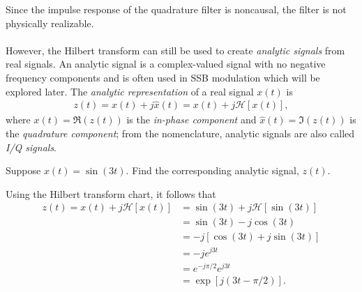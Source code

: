 \documentclass{report}
\begin{document}
Since the impulse response of the quadrature filter is noncausal, the filter is not physically realizable.
\\ \\
However, the Hilbert transform can still be used to create \emph{analytic signals} from real signals. An analytic signal 
is a complex-valued signal with no negative frequency components and is often used in SSB modulation which will be explored later. 
The \emph{analytic representation} of a real signal $x(t)$ is 
\begin{align}
    z(t) = x(t) + j\hat{x}(t) = x(t) + j\mathcal{H}[x(t)],
\end{align}
where $x(t)=\Re(z(t))$ is the \emph{in-phase component} and $\hat{x}(t)=\Im(z(t))$ is the \emph{quadrature component}; from the nomenclature, 
analytic signals are also called \emph{I/Q signals}.

\begin{example}
    Suppose $x(t)=\sin(3t)$. Find the corresponding analytic signal, $z(t)$.
\end{example}
\begin{solution}
    Using the Hilbert transform chart, it follows that  
    \begin{align*}
        z(t) = x(t) + j\mathcal{H}[x(t)] &= \sin(3t) + j\mathcal{H}[\sin(3t)] \\
        &= \sin(3t) - j\cos(3t) \\
        &= -j[\cos(3t) + j\sin(3t)] \\
        &= -je^{j3t} \\
        &= e^{-j\pi/2}e^{j3t} \\
        &= \exp[j(3t-\pi/2)].
    \end{align*}
\end{solution}
\end{document}
